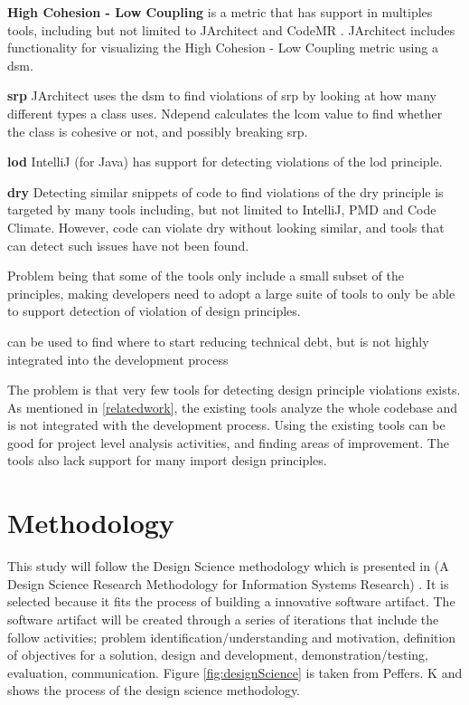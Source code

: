 \documentclass{article}
\begin{document}
\textbf{High Cohesion - Low Coupling} is a metric that has support in multiples tools, including but not limited to JArchitect \cite{jarchitect} and CodeMR \cite{codemr}. JArchitect \cite{jarchitect} includes functionality for visualizing the High Cohesion - Low Coupling metric using a \gls{dsm}. 

\textbf{\gls{srp}}
JArchitect uses the \gls{dsm} to find violations of \gls{srp} by looking at how many different types a class uses. Ndepend \cite{ndepend} calculates the \gls{lcom} value to find whether the class is cohesive or not, and possibly breaking \gls{srp}. 

\textbf{\gls{lod}}
IntelliJ \cite{IntelliJ} (for Java) has support for detecting violations of the \gls{lod} principle.

\textbf{\gls{dry}}
Detecting similar snippets of code to find violations of the \gls{dry} principle is targeted by many tools including, but not limited to IntelliJ, PMD and Code Climate. However, code can violate \gls{dry} without looking similar, and tools that can detect such issues have not been found.  




Problem being that some of the tools only include a small subset of the principles, making developers need to adopt a large suite of tools to only be able to support detection of violation of design principles.

can be used to find where to start reducing technical debt, but is not highly integrated into the development process 

The problem is that very few tools for detecting design principle violations exists. As mentioned in \ref{relatedwork}, the existing tools analyze the whole codebase and is not integrated with the development process. Using the existing tools can be good for project level analysis activities, and finding areas of improvement. The tools also lack support for many import design principles.

\section{Methodology}
\label{methodology}
This study will follow the Design Science methodology which is presented in (A Design Science Research Methodology for Information Systems Research) \cite{10.2753/MIS0742-1222240302}. It is selected because it fits the process of building a innovative software artifact. The software artifact will be created through a series of iterations that include the follow activities; problem identification/understanding and motivation, definition of objectives for a solution, design and development, demonstration/testing, evaluation, communication. Figure \ref{fig:designScience} is taken from Peffers. K \cite{Peffers2007ADS} and shows the process of the design science methodology. 
\end{document}
